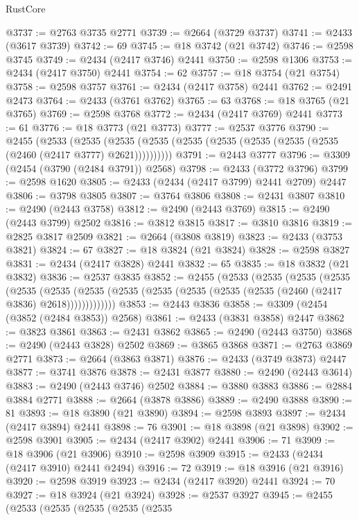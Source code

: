 \begin{lexlean}{RustCore}
\begin{coremodule}
@3737 := @2763 @3735 @2771
@3739 := @2664 (@3729 @3737)
@3741 := @2433 (@3617 @3739)
@3742 := 69
@3745 := @18 @3742 (@21 @3742)
@3746 := @2598 @3745
@3749 := @2434 (@2417 @3746) @2441
@3750 := @2598 @1306
@3753 := @2434 (@2417 @3750) @2441
@3754 := 62
@3757 := @18 @3754 (@21 @3754)
@3758 := @2598 @3757
@3761 := @2434 (@2417 @3758) @2441
@3762 := @2491 @2473
@3764 := @2433 (@3761 @3762)
@3765 := 63
@3768 := @18 @3765 (@21 @3765)
@3769 := @2598 @3768
@3772 := @2434 (@2417 @3769) @2441
@3773 := 61
@3776 := @18 @3773 (@21 @3773)
@3777 := @2537 @3776
@3790 := @2455
    (@2533
      (@2535 (@2535 (@2535 (@2535 (@2535 (@2535 (@2535 (@2535 (@2460 (@2417 @3777) @2621))))))))))
@3791 := @2443 @3777
@3796 := @3309 (@2454 (@3790 (@2484 @3791)) @2568)
@3798 := @2433 (@3772 @3796)
@3799 := @2598 @1620
@3805 := @2433 (@2434 (@2417 @3799) @2441 @2709) @2447
@3806 := @3798 @3805
@3807 := @3764 @3806
@3808 := @2431 @3807
@3810 := @2490 (@2443 @3758)
@3812 := @2490 (@2443 @3769)
@3815 := @2490 (@2443 @3799) @2502
@3816 := @3812 @3815
@3817 := @3810 @3816
@3819 := @2825 @3817 @2509
@3821 := @2664 (@3808 @3819)
@3823 := @2433 (@3753 @3821)
@3824 := 67
@3827 := @18 @3824 (@21 @3824)
@3828 := @2598 @3827
@3831 := @2434 (@2417 @3828) @2441
@3832 := 65
@3835 := @18 @3832 (@21 @3832)
@3836 := @2537 @3835
@3852 := @2455
    (@2533
      (@2535
        (@2535
          (@2535
            (@2535
              (@2535
                (@2535 (@2535 (@2535 (@2535 (@2535 (@2535 (@2460 (@2417 @3836) @2618)))))))))))))
@3853 := @2443 @3836
@3858 := @3309 (@2454 (@3852 (@2484 @3853)) @2568)
@3861 := @2433 (@3831 @3858) @2447
@3862 := @3823 @3861
@3863 := @2431 @3862
@3865 := @2490 (@2443 @3750)
@3868 := @2490 (@2443 @3828) @2502
@3869 := @3865 @3868
@3871 := @2763 @3869 @2771
@3873 := @2664 (@3863 @3871)
@3876 := @2433 (@3749 @3873) @2447
@3877 := @3741 @3876
@3878 := @2431 @3877
@3880 := @2490 (@2443 @3614)
@3883 := @2490 (@2443 @3746) @2502
@3884 := @3880 @3883
@3886 := @2884 @3884 @2771
@3888 := @2664 (@3878 @3886)
@3889 := @2490 @3888
@3890 := 81
@3893 := @18 @3890 (@21 @3890)
@3894 := @2598 @3893
@3897 := @2434 (@2417 @3894) @2441
@3898 := 76
@3901 := @18 @3898 (@21 @3898)
@3902 := @2598 @3901
@3905 := @2434 (@2417 @3902) @2441
@3906 := 71
@3909 := @18 @3906 (@21 @3906)
@3910 := @2598 @3909
@3915 := @2433 (@2434 (@2417 @3910) @2441 @2494)
@3916 := 72
@3919 := @18 @3916 (@21 @3916)
@3920 := @2598 @3919
@3923 := @2434 (@2417 @3920) @2441
@3924 := 70
@3927 := @18 @3924 (@21 @3924)
@3928 := @2537 @3927
@3945 := @2455
    (@2533
      (@2535
        (@2535
          (@2535
            (@2535

\end{coremodule}
\end{lexlean}
